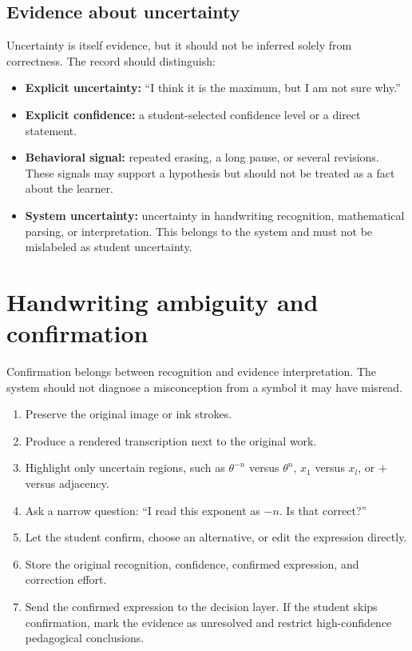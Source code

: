 \documentclass[11pt]{article}
\begin{document}
\subsection{Evidence about uncertainty}

Uncertainty is itself evidence, but it should not be inferred solely from correctness. The record should distinguish:

\begin{itemize}
    \item \textbf{Explicit uncertainty:} ``I think it is the maximum, but I am not sure why.''
    \item \textbf{Explicit confidence:} a student-selected confidence level or a direct statement.
    \item \textbf{Behavioral signal:} repeated erasing, a long pause, or several revisions. These signals may support a hypothesis but should not be treated as a fact about the learner.
    \item \textbf{System uncertainty:} uncertainty in handwriting recognition, mathematical parsing, or interpretation. This belongs to the system and must not be mislabeled as student uncertainty.
\end{itemize}

\section{Handwriting ambiguity and confirmation}

Confirmation belongs between recognition and evidence interpretation. The system should not diagnose a misconception from a symbol it may have misread.

\begin{enumerate}
    \item Preserve the original image or ink strokes.
    \item Produce a rendered transcription next to the original work.
    \item Highlight only uncertain regions, such as $\theta^{-n}$ versus $\theta^n$, $x_1$ versus $x_l$, or $+$ versus adjacency.
    \item Ask a narrow question: ``I read this exponent as $-n$. Is that correct?''
    \item Let the student confirm, choose an alternative, or edit the expression directly.
    \item Store the original recognition, confidence, confirmed expression, and correction effort.
    \item Send the confirmed expression to the decision layer. If the student skips confirmation, mark the evidence as unresolved and restrict high-confidence pedagogical conclusions.
\end{enumerate}
\end{document}
